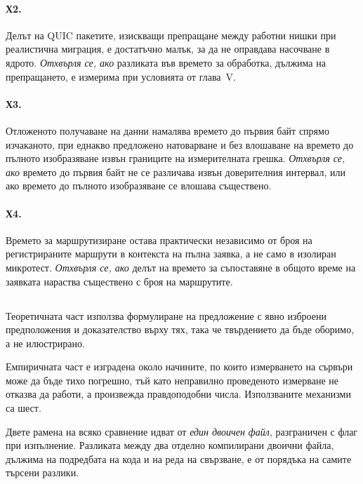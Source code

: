 \paragraph{Х2.} Делът на QUIC пакетите, изискващи препращане между работни нишки при
реалистична миграция, е достатъчно малък, за да не оправдава насочване в ядрото.
\emph{Отхвърля се, ако} разликата във времето за обработка, дължима на препращането, е
измерима при условията от глава~V.

\paragraph{Х3.} Отложеното получаване на данни намалява времето до първия байт спрямо
изчаканото, при еднакво предложено натоварване и без влошаване на времето до пълното
изобразяване извън границите на измерителната грешка.
\emph{Отхвърля се, ако} времето до първия байт не се различава извън доверителния интервал,
или ако времето до пълното изобразяване се влошава съществено.

\paragraph{Х4.} Времето за маршрутизиране остава практически независимо от броя на
регистрираните маршрути в контекста на пълна заявка, а не само в изолиран микротест.
\emph{Отхвърля се, ако} делът на времето за съпоставяне в общото време на заявката нараства
съществено с броя на маршрутите.

\subsection*{}

Теоретичната част използва формулиране на предложение с явно изброени предположения и
доказателство върху тях, така че твърдението да бъде оборимо, а не илюстрирано.

Емпиричната част е изградена около начините, по които измерването на сървъри може да бъде
тихо погрешно, тъй като неправилно проведеното измерване не отказва да работи, а произвежда
правдоподобни числа. Използваните механизми са шест.

Двете рамена на всяко сравнение идват от \emph{един двоичен файл}, разграничен с флаг при
изпълнение. Разликата между два отделно компилирани двоични файла, дължима на подредбата на
кода и на реда на свързване, е от порядъка на самите търсени разлики.

